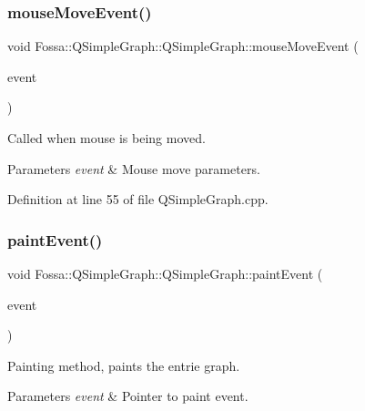 \subsubsection{\texorpdfstring{mouse\+Move\+Event()}{mouseMoveEvent()}}
{\footnotesize\ttfamily void Fossa\+::\+Q\+Simple\+Graph\+::\+Q\+Simple\+Graph\+::mouse\+Move\+Event (\begin{DoxyParamCaption}\item[{Q\+Mouse\+Event $\ast$}]{event }\end{DoxyParamCaption})\hspace{0.3cm}{\ttfamily [protected]}}



Called when mouse is being moved. 


\begin{DoxyParams}{Parameters}
{\em event} & Mouse move parameters. \\
\hline
\end{DoxyParams}


Definition at line 55 of file Q\+Simple\+Graph.\+cpp.

\mbox{\label{class_fossa_1_1_q_simple_graph_1_1_q_simple_graph_a6559739099820e1303c1dbe2c5757bc4}} 
\subsubsection{\texorpdfstring{paint\+Event()}{paintEvent()}}
{\footnotesize\ttfamily void Fossa\+::\+Q\+Simple\+Graph\+::\+Q\+Simple\+Graph\+::paint\+Event (\begin{DoxyParamCaption}\item[{Q\+Paint\+Event $\ast$}]{event }\end{DoxyParamCaption})\hspace{0.3cm}{\ttfamily [protected]}}



Painting method, paints the entrie graph. 


\begin{DoxyParams}{Parameters}
{\em event} & Pointer to paint event. \\
\hline
\end{DoxyParams}



